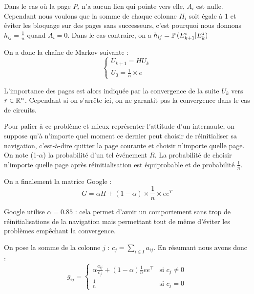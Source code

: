 		Dans le cas où la page $P_i$ n'a aucun lien qui pointe vers elle, $A_i$ est nulle.
		Cependant nous voulons que la somme de chaque colonne $H_i$ soit égale à 1 et éviter les bloquage sur des pages sans successeurs, c'est pourquoi nous donnons $h_{ij} = \frac{1}{n}$ quand $A_i = 0$.
		Dans le cas contraire, on a $h_{ij} = \mathbb{P}\,(E_{k+1}^i|E_k^j)$
		
		On a donc la chaîne de Markov suivante :
		\begin{equation}
			\label{eq-4-markov}
			\begin{cases}
				U_{k+1} = HU_k					\\
				U_0 = \frac{1}{n}\times e
			\end{cases}
		\end{equation}
		

		L'importance des pages est alors indiquée par la convergence de la suite $U_k$ vers $r\in\mathbb{R}^n$.
		Cependant si on s'arrête ici, on ne garantit pas la convergence dans le cas de circuits.

		Pour palier à ce problème et mieux représenter l'attitude d'un internaute, on suppose qu'à n'importe quel moment ce dernier peut choisir de réinitialiser sa navigation, c'est-à-dire quitter la page courante et choisir n'importe quelle page. On note (1-$\alpha$) la probabilité d'un tel événement $R$. La probabilité de choisir n'importe quelle page après réinitialisation est équiprobable et de probabilité $\frac{1}{n}$.
		
		On a finalement la matrice Google :
		\begin{equation}
			\label{eq-4-g}
			G = \alpha H + (1 - \alpha) \times \frac{1}{n}\times e e^T
		\end{equation}

		Google utilise $\alpha = 0.85$ : cela permet d'avoir un comportement sans trop de réinitialisations de la navigation mais permettant tout de même d'éviter les problèmes empêchant la convergence.

		On pose la somme de la colonne $j$ : $c_j = \sum_{i\in I} a_{ij}$.
		En résumant nous avons donc :
		\begin{equation}
			\label{eq-4-google}
			g_{ij} = \begin{cases}
				\alpha \frac{a_{ij}}{c_j} + (1-\alpha) \frac{1}{n}ee^\top	& \text{si } c_j \neq 0 \\
				\frac{1}{n}													& \text{si } c_j = 0
			\end{cases}
		\end{equation}


